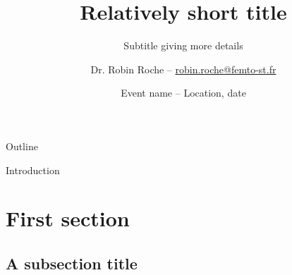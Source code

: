 \documentclass[9pt]{beamer}
\title{Relatively short title}
\subtitle{Subtitle giving more details}
\author{Dr. Robin Roche \texorpdfstring{-- \url{robin.roche@femto-st.fr}}{}}
\institute{FEMTO-ST, FCLAB, CNRS, Univ. Bourgogne Franche-Comte, UTBM}
\date{Event name -- Location, date}
\begin{document}


\begin{frame}[plain]
\titlepage
\end{frame}
 


\begin{frame}{Outline}
	\tableofcontents[pausesections,subsectionstyle=hide]
\end{frame}


\begin{frame}{Introduction}

\lipsum[1-2]

\end{frame}


\section{First section}


\subsection{A subsection title}

\end{document}
